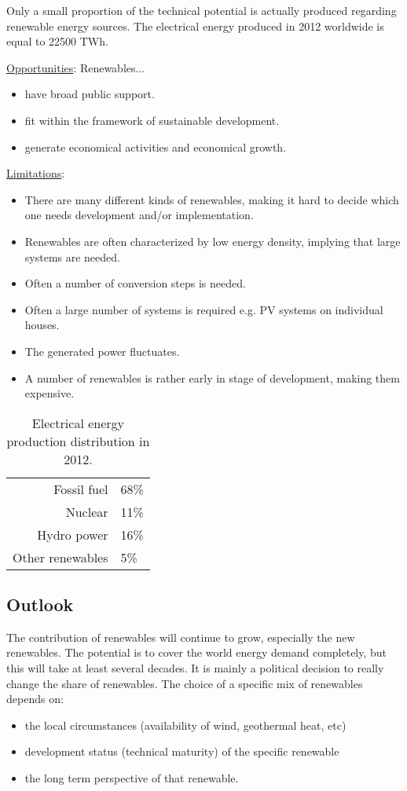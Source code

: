 \documentclass[a4paper,10pt]{article}
\begin{document}
Only a small proportion of the technical potential is actually produced regarding renewable energy sources. The electrical energy produced in 2012 worldwide is equal to 22500 TWh. \bigskip





\underline{Opportunities}: Renewables... 
\begin{itemize}
 \item have broad public support.
 \item fit within the framework of sustainable development.
 \item generate economical activities and economical growth.
\end{itemize}
\underline{Limitations}:
\begin{itemize}
 \item There are many different kinds of renewables, making it hard to decide which one needs development and/or implementation.
 \item Renewables are often characterized by low energy density, implying that large systems are needed.
 \item Often a number of conversion steps is needed.
 \item Often a large number of systems is required e.g. PV systems on individual houses.
 \item The generated power fluctuates.
 \item A number of renewables is rather early in stage of development, making them expensive.
\end{itemize}

\begin{table}[ht] \centering
 \begin{tabular}{r|l}
  Fossil fuel & 68\% \\
  Nuclear & 11\% \\
  Hydro power & 16\% \\
  Other renewables & 5\% 
 \end{tabular}
\caption{Electrical energy production distribution in 2012.}
\end{table}

\subsection{Outlook}
The contribution of renewables will continue to grow, especially the new renewables. The potential is to cover the world energy demand completely, but this will take at least several decades. It is mainly a political decision to really change the share of renewables. The choice of a specific mix of renewables depends on:
\begin{itemize}
 \item the local circumstances (availability of wind, geothermal heat, etc)
 \item development status (technical maturity) of the specific renewable
 \item the long term perspective of that renewable.
\end{itemize}
\end{document}
